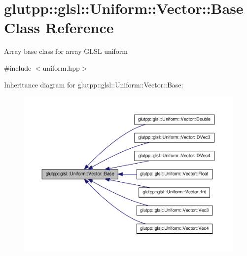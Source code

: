 \hypertarget{classglutpp_1_1glsl_1_1Uniform_1_1Vector_1_1Base}{\section{glutpp\-:\-:glsl\-:\-:\-Uniform\-:\-:\-Vector\-:\-:\-Base \-Class \-Reference}
\label{classglutpp_1_1glsl_1_1Uniform_1_1Vector_1_1Base}
}


\-Array base class for array \-G\-L\-S\-L uniform  




{\ttfamily \#include $<$uniform.\-hpp$>$}



\-Inheritance diagram for glutpp\-:\-:glsl\-:\-:\-Uniform\-:\-:\-Vector\-:\-:\-Base\-:
\nopagebreak
\begin{figure}[H]
\begin{center}
\leavevmode
\includegraphics[width=350pt]{classglutpp_1_1glsl_1_1Uniform_1_1Vector_1_1Base__inherit__graph}
\end{center}
\end{figure}
